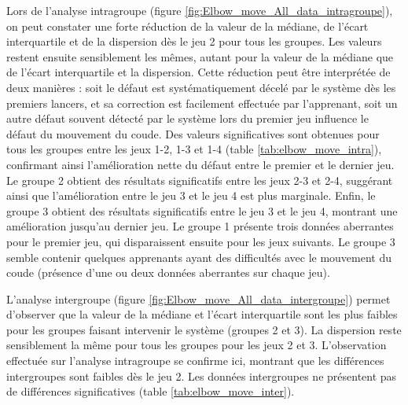 Lors de l'analyse intragroupe (figure \ref{fig:Elbow_move_All_data_intragroupe}), on peut constater une forte réduction de la valeur de la médiane, de l'écart interquartile et de la dispersion dès le jeu 2 pour tous les groupes. Les valeurs restent ensuite sensiblement les mêmes, autant pour la valeur de la médiane que de l'écart interquartile et la dispersion. Cette réduction peut être interprétée de deux manières : soit le défaut est systématiquement décelé par le système dès les premiers lancers, et sa correction est facilement effectuée par l'apprenant, soit un autre défaut souvent détecté par le système lors du premier jeu influence le défaut du mouvement du coude. Des valeurs significatives sont obtenues pour tous les groupes entre les jeux 1-2, 1-3 et 1-4 (table \ref{tab:elbow_move_intra}), confirmant ainsi l'amélioration nette du défaut entre le premier et le dernier jeu. Le groupe 2 obtient des résultats significatifs entre les jeux 2-3 et 2-4, suggérant ainsi que l'amélioration entre le jeu 3 et le jeu 4 est plus marginale. Enfin, le groupe 3 obtient des résultats significatifs entre le jeu 3 et le jeu 4, montrant une amélioration jusqu'au dernier jeu. Le groupe 1 présente trois données aberrantes pour le premier jeu, qui disparaissent ensuite pour les jeux suivants. Le groupe 3 semble contenir quelques apprenants ayant des difficultés avec le mouvement du coude (présence d'une ou deux données aberrantes sur chaque jeu).

L'analyse intergroupe (figure \ref{fig:Elbow_move_All_data_intergroupe}) permet d'observer que la valeur de la médiane et l'écart interquartile sont les plus faibles pour les groupes faisant intervenir le système (groupes 2 et 3). La dispersion reste sensiblement la même pour tous les groupes pour les jeux 2 et 3. L'observation effectuée sur l'analyse intragroupe se confirme ici, montrant que les différences intergroupes sont faibles dès le jeu 2. Les données intergroupes ne présentent pas de différences significatives (table \ref{tab:elbow_move_inter}).

